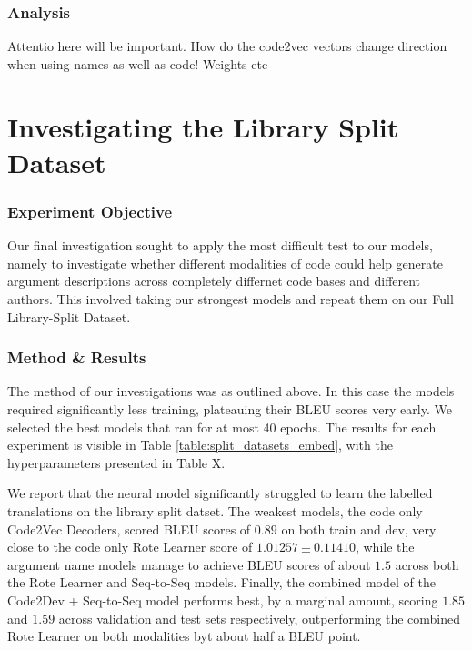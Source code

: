 \subsubsection{Analysis} %




Attentio here will be important. 
How do the code2vec vectors change direction when using names as well as code!
Weights etc


\section{Investigating the Library Split Dataset} %
\label{sec:analysis}

\subsubsection{Experiment Objective} %

Our final investigation sought to apply the most difficult test to our models, namely to investigate whether different modalities of code could help generate argument descriptions across completely differnet code bases and different authors.
This involved taking our strongest models and repeat them on our Full Library-Split Dataset.

\subsubsection{Method \& Results}  %

The method of our investigations was as outlined above. In this case the models required significantly less training, plateauing their BLEU scores very early. We selected the best models that ran for at most 40 epochs. 
The results for each experiment is visible in Table \ref{table:split_datasets_embed}, with the hyperparameters presented in Table X.

We report that the neural model significantly struggled to learn the labelled translations on the library split datset.
The weakest models, the code only Code2Vec Decoders, scored BLEU scores of $0.89$ on both train and dev, very close to the code only Rote Learner score of   $ 1.01257 \pm  0.11410$, while the argument name models manage to achieve BLEU scores of about $1.5$ across both the Rote Learner and Seq-to-Seq models. 
Finally, the combined model of the Code2Dev + Seq-to-Seq model performs best, by a marginal amount, scoring  $ 1.85 $ and $ 1.59 $ across validation and test sets respectively,  outperforming the combined Rote Learner on both modalities byt about half a BLEU point.



